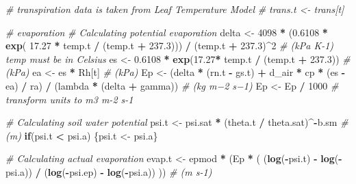 \documentclass[
]{article}
\newenvironment{Shaded}{\begin{snugshade}}{\end{snugshade}}
\newcommand{\CommentTok}[1]{\textcolor[rgb]{0.56,0.35,0.01}{\textit{#1}}}
\newcommand{\ControlFlowTok}[1]{\textcolor[rgb]{0.13,0.29,0.53}{\textbf{#1}}}
\newcommand{\DecValTok}[1]{\textcolor[rgb]{0.00,0.00,0.81}{#1}}
\newcommand{\FloatTok}[1]{\textcolor[rgb]{0.00,0.00,0.81}{#1}}
\newcommand{\KeywordTok}[1]{\textcolor[rgb]{0.13,0.29,0.53}{\textbf{#1}}}
\newcommand{\NormalTok}[1]{#1}
\newcommand{\OperatorTok}[1]{\textcolor[rgb]{0.81,0.36,0.00}{\textbf{#1}}}
\newcommand{\StringTok}[1]{\textcolor[rgb]{0.31,0.60,0.02}{#1}}
\begin{document}
\begin{Shaded}
\begin{Highlighting}[]
{{{{    \CommentTok{# transpiration data is taken from Leaf Temperature Model}
    \CommentTok{# trans.t <- trans[t]}

    \CommentTok{# evaporation}
    \CommentTok{# Calculating potential evaporation}
\NormalTok{    delta <-}\StringTok{ }\DecValTok{4098} \OperatorTok{*}\StringTok{ }\NormalTok{(}\FloatTok{0.6108} \OperatorTok{*}\StringTok{ }\KeywordTok{exp}\NormalTok{( }\FloatTok{17.27} \OperatorTok{*}\StringTok{ }\NormalTok{temp.t }\OperatorTok{/}\StringTok{ }\NormalTok{(temp.t }\OperatorTok{+}\StringTok{ }\FloatTok{237.3}\NormalTok{))) }\OperatorTok{/}\StringTok{ }\NormalTok{(temp.t }\OperatorTok{+}\StringTok{ }\FloatTok{237.3}\NormalTok{)}\OperatorTok{^}\DecValTok{2}  \CommentTok{# (kPa K-1) temp must be in Celsius}
\NormalTok{    es <-}\StringTok{ }\FloatTok{0.6108} \OperatorTok{*}\StringTok{ }\KeywordTok{exp}\NormalTok{(}\FloatTok{17.27}\OperatorTok{*}\StringTok{ }\NormalTok{temp.t }\OperatorTok{/}\StringTok{ }\NormalTok{(temp.t }\OperatorTok{+}\StringTok{ }\FloatTok{237.3}\NormalTok{)) }\CommentTok{# (kPa)}
\NormalTok{    ea <-}\StringTok{ }\NormalTok{es }\OperatorTok{*}\StringTok{ }\NormalTok{Rh[t] }\CommentTok{# (kPa)}
\NormalTok{    Ep <-}\StringTok{ }\NormalTok{(delta }\OperatorTok{*}\StringTok{ }\NormalTok{(rn.t }\OperatorTok{-}\StringTok{ }\NormalTok{gs.t) }\OperatorTok{+}\StringTok{ }\NormalTok{d_air }\OperatorTok{*}\StringTok{ }\NormalTok{cp }\OperatorTok{*}\StringTok{ }\NormalTok{(es }\OperatorTok{-}\StringTok{ }\NormalTok{ea) }\OperatorTok{/}\StringTok{ }\NormalTok{ra) }\OperatorTok{/}\StringTok{ }\NormalTok{(lambda }\OperatorTok{*}\StringTok{ }\NormalTok{(delta }\OperatorTok{+}\StringTok{ }\NormalTok{gamma)) }\CommentTok{# (kg m−2 s−1)}
\NormalTok{    Ep <-}\StringTok{ }\NormalTok{Ep }\OperatorTok{/}\StringTok{ }\DecValTok{1000} \CommentTok{# transform units to m3 m-2 s-1}

    \CommentTok{# Calculating soil water potential}
\NormalTok{    psi.t <-}\StringTok{ }\NormalTok{psi.sat }\OperatorTok{*}\StringTok{ }\NormalTok{(theta.t }\OperatorTok{/}\StringTok{ }\NormalTok{theta.sat)}\OperatorTok{^-}\NormalTok{b.sm   }\CommentTok{# (m)}
    \ControlFlowTok{if}\NormalTok{(psi.t }\OperatorTok{<}\StringTok{ }\NormalTok{psi.a) \{psi.t <-}\StringTok{ }\NormalTok{psi.a\} }

    \CommentTok{# Calculating actual evaporation}
\NormalTok{    evap.t <-}\StringTok{ }\NormalTok{epmod }\OperatorTok{*}\StringTok{ }\NormalTok{(Ep }\OperatorTok{*}\StringTok{ }\NormalTok{( (}\KeywordTok{log}\NormalTok{(}\OperatorTok{-}\NormalTok{psi.t) }\OperatorTok{-}\StringTok{ }\KeywordTok{log}\NormalTok{(}\OperatorTok{-}\NormalTok{psi.a)) }\OperatorTok{/}\StringTok{ }\NormalTok{(}\KeywordTok{log}\NormalTok{(}\OperatorTok{-}\NormalTok{psi.ep) }\OperatorTok{-}\StringTok{ }\KeywordTok{log}\NormalTok{(}\OperatorTok{-}\NormalTok{psi.a)) ))  }\CommentTok{# (m s-1)}

}}}}
\end{Highlighting}
\end{Shaded}
\end{document}

